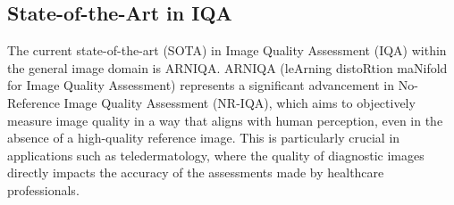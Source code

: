 \subsection{State-of-the-Art in IQA}
\label{sub:SOTA_IQA}
The current state-of-the-art (SOTA) in Image Quality Assessment (IQA) within the general image domain is ARNIQA. ARNIQA (leArning distoRtion maNifold for Image Quality Assessment) represents a significant advancement in No-Reference Image Quality Assessment (NR-IQA), which aims to objectively measure image quality in a way that aligns with human perception, even in the absence of a high-quality reference image. This is particularly crucial in applications such as teledermatology, where the quality of diagnostic images directly impacts the accuracy of the assessments made by healthcare professionals.\par
